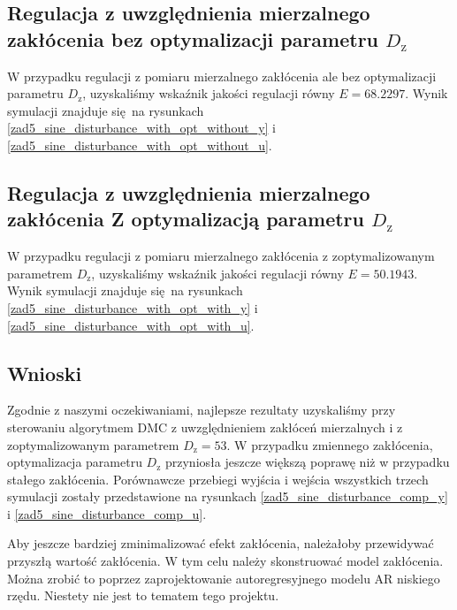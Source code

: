 \subsection{Regulacja z uwzględnienia mierzalnego zakłócenia bez optymalizacji parametru $D_{\mathrm{z}}$}
W przypadku regulacji z pomiaru mierzalnego zakłócenia ale bez optymalizacji parametru $D_{\mathrm{z}}$, uzyskaliśmy wskaźnik jakości regulacji
równy $E = \num{68,2297}$. Wynik symulacji znajduje się na rysunkach \ref{zad5_sine_disturbance_with_opt_without_y}
i \ref{zad5_sine_disturbance_with_opt_without_u}.

\subsection{Regulacja z uwzględnienia mierzalnego zakłócenia Z optymalizacją parametru $D_{\mathrm{z}}$}
W przypadku regulacji z pomiaru mierzalnego zakłócenia z zoptymalizowanym parametrem $D_{\mathrm{z}}$, uzyskaliśmy wskaźnik jakości regulacji
równy $E = \num{50,1943}$. Wynik symulacji znajduje się na rysunkach \ref{zad5_sine_disturbance_with_opt_with_y}
i \ref{zad5_sine_disturbance_with_opt_with_u}.

\subsection{Wnioski}
Zgodnie z naszymi oczekiwaniami, najlepsze rezultaty uzyskaliśmy przy sterowaniu algorytmem DMC 
z uwzględnieniem zakłóceń mierzalnych i z zoptymalizowanym parametrem $D_{\mathrm{z}} = \num{53}$. W przypadku zmiennego 
zakłócenia, optymalizacja parametru $D_{\mathrm{z}}$ przyniosła jeszcze większą poprawę niż w przypadku
stałego zakłócenia. Porównawcze przebiegi
wyjścia i wejścia wszystkich trzech symulacji zostały przedstawione na rysunkach \ref{zad5_sine_disturbance_comp_y}
i \ref{zad5_sine_disturbance_comp_u}. 

Aby jeszcze bardziej zminimalizować efekt zakłócenia, należałoby przewidywać
przyszłą wartość zakłócenia. W tym celu należy skonstruować model zakłócenia. Można zrobić to poprzez 
zaprojektowanie autoregresyjnego modelu AR niskiego rzędu. Niestety nie jest to tematem tego projektu.  

